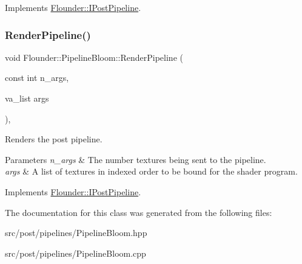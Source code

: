 Implements \hyperlink{class_flounder_1_1_i_post_pipeline_a3953881189f3c7876ce4bb5e88f1796c}{Flounder\+::\+I\+Post\+Pipeline}.

\mbox{\label{class_flounder_1_1_pipeline_bloom_a2bff537e219a74540c1bda4c31fb4354}} 
\subsubsection{\texorpdfstring{Render\+Pipeline()}{RenderPipeline()}}
{\footnotesize\ttfamily void Flounder\+::\+Pipeline\+Bloom\+::\+Render\+Pipeline (\begin{DoxyParamCaption}\item[{const int}]{n\+\_\+args,  }\item[{va\+\_\+list}]{args }\end{DoxyParamCaption})\hspace{0.3cm}{\ttfamily [override]}, {\ttfamily [virtual]}}



Renders the post pipeline. 


\begin{DoxyParams}{Parameters}
{\em n\+\_\+args} & The number textures being sent to the pipeline. \\
\hline
{\em args} & A list of textures in indexed order to be bound for the shader program. \\
\hline
\end{DoxyParams}


Implements \hyperlink{class_flounder_1_1_i_post_pipeline_ad5388fe41486385c55896bdd9439bf60}{Flounder\+::\+I\+Post\+Pipeline}.



The documentation for this class was generated from the following files\+:\begin{DoxyCompactItemize}
\item 
src/post/pipelines/Pipeline\+Bloom.\+hpp\item 
src/post/pipelines/Pipeline\+Bloom.\+cpp\end{DoxyCompactItemize}
